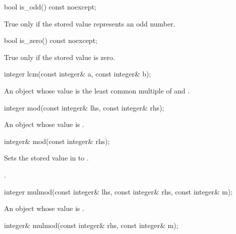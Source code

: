 \begin{itemdecl}
bool is_odd() const noexcept;	
\end{itemdecl}

\begin{itemdescr}
\returns True only if the stored value represents an odd number.		
\end{itemdescr}

\begin{itemdecl}
bool is_zero() const noexcept;	
\end{itemdecl}

\begin{itemdescr}
\returns True only if the stored value is zero.
\end{itemdescr}

\begin{itemdecl}
integer lcm(const integer& a, const integer& b);	
\end{itemdecl}

\begin{itemdescr}
\returns An object whose value is the least common multiple of  and .		
\end{itemdescr}

\begin{itemdecl}
integer mod(const integer& lhs, const integer& rhs);	
\end{itemdecl}

\begin{itemdescr}
\returns An object whose value is .   		
\end{itemdescr}

\begin{itemdecl}
integer& mod(const integer& rhs);	
\end{itemdecl}

\begin{itemdescr}
\effects Sets the stored value in  to .
	
\returns {}.	
\end{itemdescr}

\begin{itemdecl}
integer mulmod(const integer& lhs, const integer& rhs, const integer& m);	
\end{itemdecl}

\begin{itemdescr}
\returns An object whose value is .		
\end{itemdescr}

\begin{itemdecl}
integer& mulmod(const integer& rhs, const integer& m);	
\end{itemdecl}

